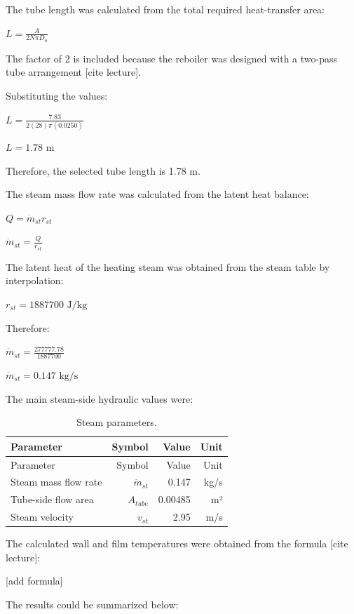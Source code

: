 The tube length was calculated from the total required heat-transfer
area:

\(L = \frac{A}{2N \pi D_o}\)

The factor of 2 is included because the reboiler was designed with a
two-pass tube arrangement {[}cite lecture{]}.

Substituting the values:

\(L = \frac{7.83}{2(28)\pi(0.0250)}\)

\(L = 1.78 \text{ m}\)

Therefore, the selected tube length is 1.78 m.

The steam mass flow rate was calculated from the latent heat balance:

\(Q = \dot{m}_{st} r_{st}\)

\(\dot{m}_{st} = \frac{Q}{r_{st}}\)

The latent heat of the heating steam was obtained from the steam table
by interpolation:

\(r_{st} = 1887700 \text{ J/kg}\)

Therefore:

\(\dot{m}_{st} = \frac{277777.78}{1887700}\)

\(\dot{m}_{st} = 0.147 \text{ kg/s}\)

The main steam-side hydraulic values were:

\begin{longtable}[]{@{}lrrr@{}}
\caption{Steam parameters. \label{tab:Steam parameters}}\tabularnewline
\toprule\noalign{}
Parameter & Symbol & Value & Unit \\
\midrule\noalign{}
\endfirsthead
\toprule\noalign{}
Parameter & Symbol & Value & Unit \\
\midrule\noalign{}
\endhead
\bottomrule\noalign{}
\endlastfoot
Steam mass flow rate & \(\dot{m}_{st}\) & 0.147 & kg/s \\
Tube-side flow area & \(A_{tube}\) & 0.00485 & m² \\
Steam velocity & \(v_{st}\) & 2.95 & m/s \\
\end{longtable}

The calculated wall and film temperatures were obtained from the formula
{[}cite lecture{]}:

{[}add formula{]}

The results could be summarized below:

